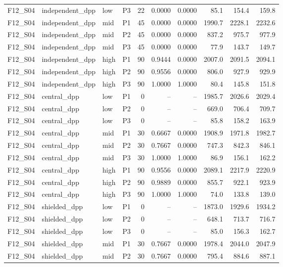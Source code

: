 \begin{longtable}{llllrrrrrr}
F12\_S04 & independent\_dpp & low & P3 & 22 & 0.0000 & 0.0000 & 85.1 & 154.4 & 159.8 \\
F12\_S04 & independent\_dpp & mid & P1 & 45 & 0.0000 & 0.0000 & 1990.7 & 2228.1 & 2232.6 \\
F12\_S04 & independent\_dpp & mid & P2 & 45 & 0.0000 & 0.0000 & 837.2 & 975.7 & 977.9 \\
F12\_S04 & independent\_dpp & mid & P3 & 45 & 0.0000 & 0.0000 & 77.9 & 143.7 & 149.7 \\
F12\_S04 & independent\_dpp & high & P1 & 90 & 0.9444 & 0.0000 & 2007.0 & 2091.5 & 2094.1 \\
F12\_S04 & independent\_dpp & high & P2 & 90 & 0.9556 & 0.0000 & 806.0 & 927.9 & 929.9 \\
F12\_S04 & independent\_dpp & high & P3 & 90 & 1.0000 & 1.0000 & 80.4 & 145.8 & 151.8 \\
F12\_S04 & central\_dpp & low & P1 & 0 & -- & -- & 1985.7 & 2026.6 & 2029.4 \\
F12\_S04 & central\_dpp & low & P2 & 0 & -- & -- & 669.0 & 706.4 & 709.7 \\
F12\_S04 & central\_dpp & low & P3 & 0 & -- & -- & 85.8 & 158.2 & 163.9 \\
F12\_S04 & central\_dpp & mid & P1 & 30 & 0.6667 & 0.0000 & 1908.9 & 1971.8 & 1982.7 \\
F12\_S04 & central\_dpp & mid & P2 & 30 & 0.7667 & 0.0000 & 747.3 & 842.3 & 846.1 \\
F12\_S04 & central\_dpp & mid & P3 & 30 & 1.0000 & 1.0000 & 86.9 & 156.1 & 162.2 \\
F12\_S04 & central\_dpp & high & P1 & 90 & 0.9556 & 0.0000 & 2089.1 & 2217.9 & 2220.9 \\
F12\_S04 & central\_dpp & high & P2 & 90 & 0.9889 & 0.0000 & 855.7 & 922.1 & 923.9 \\
F12\_S04 & central\_dpp & high & P3 & 90 & 1.0000 & 1.0000 & 74.0 & 133.8 & 139.0 \\
F12\_S04 & shielded\_dpp & low & P1 & 0 & -- & -- & 1873.0 & 1929.6 & 1934.2 \\
F12\_S04 & shielded\_dpp & low & P2 & 0 & -- & -- & 648.1 & 713.7 & 716.7 \\
F12\_S04 & shielded\_dpp & low & P3 & 0 & -- & -- & 85.0 & 156.3 & 162.7 \\
F12\_S04 & shielded\_dpp & mid & P1 & 30 & 0.7667 & 0.0000 & 1978.4 & 2044.0 & 2047.9 \\
F12\_S04 & shielded\_dpp & mid & P2 & 30 & 0.7667 & 0.0000 & 795.4 & 884.6 & 887.1 \\

\end{longtable}
